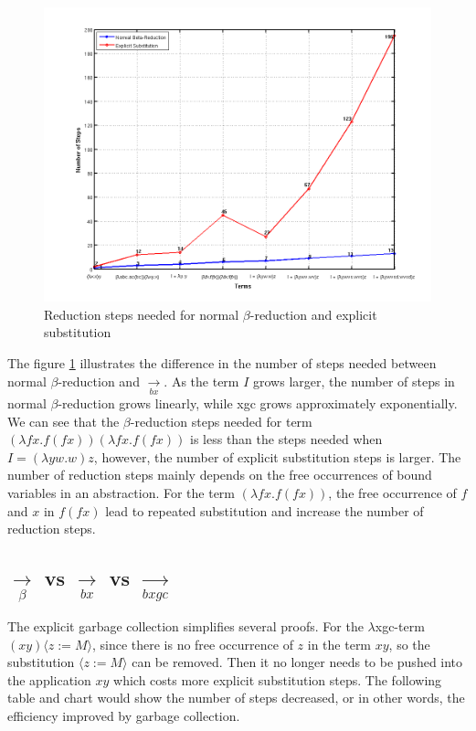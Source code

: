 \begin{figure}[h!]
\includegraphics[width=\textwidth]{pics/zhang_01}
\caption{Reduction steps needed for normal $\beta$-reduction and explicit substitution}
\label{fig:betax}
\end{figure}

The figure \ref{fig:betax} illustrates the difference in the number of steps needed between normal $\beta$-reduction and $\xrightarrow[bx]{}$. As the term $I$ grows larger, the number of steps in normal $\beta$-reduction grows linearly, while xgc grows approximately exponentially. We can see that the $\beta$-reduction steps needed for term $(\lambda fx.f(fx))(\lambda fx.f(fx))$ is less than the steps needed when $I = (\lambda yw.w)z$, however, the number of explicit substitution steps is larger. The number of reduction steps mainly depends on the free occurrences of bound variables in an abstraction. For the term $(\lambda fx.f(fx))$, the free occurrence of $f$ and $x$ in $f(fx)$ lead to repeated substitution and increase the number of reduction steps.  


\subsection{$\xrightarrow[\beta ]{}$ vs $\xrightarrow[bx]{}$ vs $\xrightarrow[bxgc]{}$}

The explicit garbage collection simplifies several proofs. For the $\lambda$xgc-term $(xy)\langle z:=M\rangle$, since there is no free occurrence of $z$ in the term $xy$, so the substitution $\langle z:=M\rangle$ can be removed. Then it no longer needs to be pushed into the application $xy$ which costs more explicit substitution steps. The following table and chart would show the number of steps decreased, or in other words, the efficiency improved by garbage collection.  

